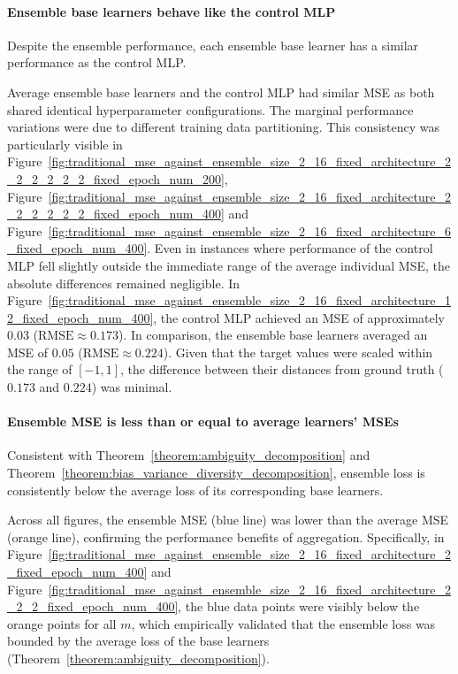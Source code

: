 \paragraph{Ensemble base learners behave like the control MLP}
Despite the ensemble performance, each ensemble base learner has a similar performance as the control MLP. 

Average ensemble base learners and the control MLP had similar MSE as both shared identical hyperparameter configurations. The marginal performance variations were due to different training data partitioning. This consistency was particularly visible in Figure~\ref{fig:traditional_mse_against_ensemble_size_2_16_fixed_architecture_2_2_2_2_2_2_fixed_epoch_num_200}, Figure~\ref{fig:traditional_mse_against_ensemble_size_2_16_fixed_architecture_2_2_2_2_2_2_fixed_epoch_num_400} and Figure~\ref{fig:traditional_mse_against_ensemble_size_2_16_fixed_architecture_6_fixed_epoch_num_400}. Even in instances where performance of the control MLP fell slightly outside the immediate range of the average individual MSE, the absolute differences remained negligible. In Figure~\ref{fig:traditional_mse_against_ensemble_size_2_16_fixed_architecture_12_fixed_epoch_num_400}, the control MLP achieved an MSE of approximately $0.03$ ($\text{RMSE} \approx 0.173$). In comparison, the ensemble base learners averaged an MSE of $0.05$ ($\text{RMSE} \approx 0.224$). Given that the target values were scaled within the range of $[-1, 1]$, the difference between their distances from ground truth ($0.173$ and $0.224$) was minimal. 

\paragraph{Ensemble MSE is less than or equal to average learners' MSEs}
Consistent with Theorem~\ref{theorem:ambiguity_decomposition} and Theorem~\ref{theorem:bias_variance_diversity_decomposition}, ensemble loss is consistently below the average loss of its corresponding base learners. 

Across all figures, the ensemble MSE (blue line) was lower than the average MSE (orange line), confirming the performance benefits of aggregation. Specifically, in Figure~\ref{fig:traditional_mse_against_ensemble_size_2_16_fixed_architecture_2_fixed_epoch_num_400} and Figure~\ref{fig:traditional_mse_against_ensemble_size_2_16_fixed_architecture_2_2_2_fixed_epoch_num_400}, the blue data points were visibly below the orange points for all $m$, which empirically validated that the ensemble loss was bounded by the average loss of the base learners (Theorem~\ref{theorem:ambiguity_decomposition}). 

